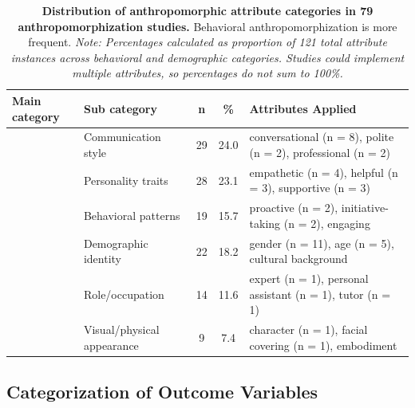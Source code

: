 \documentclass[manuscript,anonymous,sigconf]{acmart}
\begin{document}
\begin{table}[t]
\centering
\caption{\textbf{Distribution of anthropomorphic attribute categories in 79 anthropomorphization studies.} Behavioral anthropomorphization is more frequent. \textit{Note: Percentages calculated as proportion of 121 total attribute instances across behavioral and demographic categories. Studies could implement multiple attributes, so percentages do not sum to 100\%.}}
\label{tab:attr-dist}
\begin{tabularx}{\textwidth}{@{}llccX@{}}
\toprule
\textbf{Main category} & \textbf{Sub category} & \textbf{n} & \textbf{\%} & \textbf{Attributes Applied} \\
\midrule
{} & Communication style & 29 & 24.0 & conversational (n = 8), polite (n = 2), professional (n = 2) \\
& Personality traits & 28 & 23.1 & empathetic (n = 4), helpful (n = 3), supportive (n = 3) \\
& Behavioral patterns & 19 & 15.7 & proactive (n = 2), initiative-taking (n = 2), engaging \\
\midrule
{} & Demographic identity & 22 & 18.2 & gender (n = 11), age (n = 5), cultural background \\
& Role/occupation & 14 & 11.6 & expert (n = 1), personal assistant (n = 1), tutor (n = 1) \\
& Visual/physical appearance & 9 & 7.4 & character (n = 1), facial covering (n = 1), embodiment \\
\bottomrule
\end{tabularx}
\end{table}

\subsection{Categorization of Outcome Variables}
\end{document}
